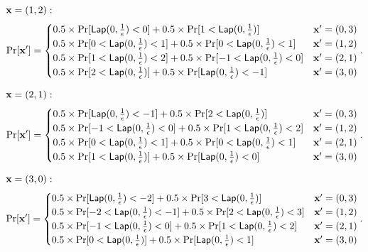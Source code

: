\documentclass{article}
\begin{document}
{{\noindent $\textbf{x} = (1,2):$
\[
\Pr[\dataobs']
= \begin{cases}
 	0.5 \times 
 	\Pr[	\lap{0}{\frac{1}{\epsilon}}	<	0] 
 	+ 	
 	0.5 \times 
 	\Pr[	1	< \lap{0}{\frac{1}{\epsilon}}] 
	& \dataobs' = (0, 3)\\
%
 	0.5 \times 
 	\Pr[	0	< \lap{0}{\frac{1}{\epsilon}}	<	1] 
 	+ 	
 	0.5 \times 
 	\Pr[	0	< \lap{0}{\frac{1}{\epsilon}}	<	1] 
	& \dataobs' = (1, 2)\\
%
 	0.5 \times 
 	\Pr[	1	<	\lap{0}{\frac{1}{\epsilon}}	<	2] 
 	+ 	
 	0.5 \times 
 	\Pr[	-1	< \lap{0}{\frac{1}{\epsilon}}	<	0] 
	& \dataobs' = (2, 1)\\
%
 	0.5 \times 
 	\Pr[	2	<	\lap{0}{\frac{1}{\epsilon}}] 
 	+ 	
 	0.5 \times 
 	\Pr[	\lap{0}{\frac{1}{\epsilon}}	<	-1] 
	& \dataobs' = (3, 0)
\end{cases}.
\]

\noindent $\textbf{x} = (2,1):$
\[
\Pr[\dataobs']
= \begin{cases}
 	0.5 \times 
 	\Pr[	\lap{0}{\frac{1}{\epsilon}}	<	-1]
 	+ 	
 	0.5 \times 
 	\Pr[	2	< \lap{0}{\frac{1}{\epsilon}}] 
%
	& \dataobs' = (0, 3)\\
%
 	0.5 \times 
 	\Pr[	-1	< \lap{0}{\frac{1}{\epsilon}}	<	0] 
 	+ 	
 	0.5 \times 
 	\Pr[	1	< \lap{0}{\frac{1}{\epsilon}}	<	2] 
%
	& \dataobs' = (1, 2)\\
%
 	0.5 \times 
 	\Pr[	0	<	\lap{0}{\frac{1}{\epsilon}}	<	1] 
 	+ 	
 	0.5 \times 
 	\Pr[	0	< \lap{0}{\frac{1}{\epsilon}}	<	1] 
%
& \dataobs' = (2, 1)\\
%
 	0.5 \times 
 	\Pr[	1	<	\lap{0}{\frac{1}{\epsilon}}	] 
 	+ 	
 	0.5 \times 
 	\Pr[	\lap{0}{\frac{1}{\epsilon}}	<	0] 
%
& \dataobs' = (3, 0)
\end{cases}.
\]



\noindent $\textbf{x} = (3,0):$
\[
\Pr[\dataobs']
= \begin{cases}
 	0.5 \times 
 	\Pr[	\lap{0}{\frac{1}{\epsilon}}	<	-2] 
 	+ 	
 	0.5 \times 
 	\Pr[	3	< \lap{0}{\frac{1}{\epsilon}}] 
	& \dataobs' = (0, 3)\\
%
 	0.5 \times 
 	\Pr[	-2	< \lap{0}{\frac{1}{\epsilon}}	<	-1] 
 	+ 	
 	0.5 \times 
 	\Pr[	2	< \lap{0}{\frac{1}{\epsilon}}	<	3] 
	& \dataobs' = (1, 2)\\
%
 	0.5 \times 
 	\Pr[	-1	<	\lap{0}{\frac{1}{\epsilon}}	<	0] 
 	+ 	
 	0.5 \times 
 	\Pr[	1	< \lap{0}{\frac{1}{\epsilon}}	<	2] 
	& \dataobs' = (2, 1)\\
%
 	0.5 \times 
 	\Pr[	0	<	\lap{0}{\frac{1}{\epsilon}}	] 
 	+ 	
 	0.5 \times 
 	\Pr[	\lap{0}{\frac{1}{\epsilon}}	<	1] 
	& \dataobs' = (3, 0)
\end{cases}.
\]
}

}
\end{document}
